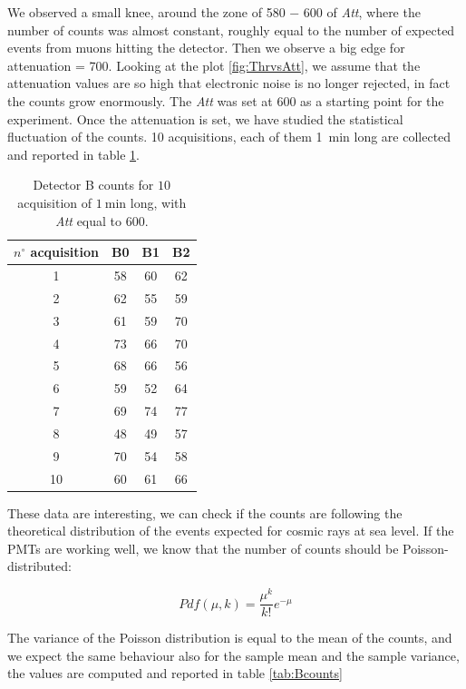 We observed a small knee, around the zone of 580 − 600 of \textit{Att}, where the number of counts was almost constant, roughly equal to the number of expected events from muons hitting the detector. Then we observe a big edge for attenuation = 700. Looking at the plot \ref{fig:ThrvsAtt}, we assume that the attenuation values are so high that electronic noise is no longer rejected, in fact the counts grow enormously. The \textit{Att} was set at 600 as a starting point for the experiment.
\newpage
Once the attenuation is set, we have studied the statistical fluctuation of the counts. 10 acquisitions, each of them \SI{1}{\minute} long are collected and reported in table \ref{tab:CountB}.

\begin{table}[!htb]
\centering
\begin{tabular}{c|c|c|c}
\hline 
$n^{\circ}$ acquisition & B0 & B1 & B2 \\
\hline 
1 & 58 & 60 & 62 \\  
2 & 62 & 55 & 59 \\ 
3 & 61 & 59 & 70 \\ 
4 & 73 & 66 & 70 \\ 
5 & 68 & 66 & 56 \\ 
6 & 59 & 52 & 64 \\ 
7 & 69 & 74 & 77 \\
8 & 48 & 49 & 57 \\ 
9 & 70 & 54 & 58 \\ 
10 & 60 & 61 & 66\\
\hline
\end{tabular} 
\caption{Detector B counts for $10$ acquisition of $\SI{1}{\minute}$ long, with \textit{Att} equal to 600.}
\label{tab:CountB}
\end{table}

These data are interesting, we can check if the counts are following the theoretical distribution of the events expected for cosmic rays at sea level. If the PMTs are working well, we know that the number of counts should be Poisson-distributed:

\begin{equation}
Pdf(\mu,k) =  \frac{\mu^{k}}{k!} e^{-\mu}
\end{equation}

The variance of the Poisson distribution is equal to the mean of the counts, and we expect the same behaviour also for the sample mean and the sample variance, the values are computed and reported in table \ref{tab:Bcounts}

